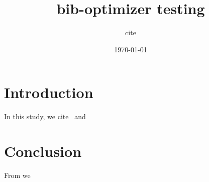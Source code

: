 \documentclass[12pt,twocolumn,letterpaper]{article}
\begin{document}
\title{bib-optimizer testing}
\author{cite}
\date{\today}
\maketitle
\section{Introduction}
In this study, we cite~\cite{firstref, secondref} and 

\section{Conclusion}
\label{sec:conclusion}
From \cite{thirdref} we



\end{document}
